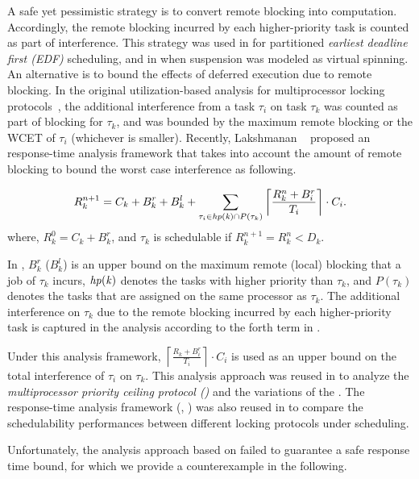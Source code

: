 A safe yet pessimistic strategy is to convert remote blocking into computation. Accordingly, the remote blocking incurred by each higher-priority task is counted as part of interference. This strategy was used in \cite{block-2007} for partitioned \emph{earliest deadline first (EDF)} scheduling, and in \cite{lakshmanan-2009} when suspension was modeled as virtual spinning. An alternative is to bound the effects of deferred execution due to remote blocking. In the original utilization-based analysis for multiprocessor locking protocols~\cite{rajkumar-1990,RSL:88}, the additional interference from a task $\tau_i$ on task $\tau_k$ was counted as part of blocking for $\tau_k$, and was bounded by the maximum remote blocking or the WCET of $\tau_i$ (whichever is smaller). Recently, Lakshmanan \etal~\cite{lakshmanan-2009} proposed an response-time analysis framework that takes into account the amount of remote blocking to bound the worst case interference as following. 

\begin{align}
\label{eq:wcrt}
R_k^{n+1} = C_k + B_k^r + B_k^l + \sum_{\tau_i \in \fun{hp(k)} \cap P(\tau_k)} \left \lceil \frac{R_k^n + B_i^r}{T_i} \right \rceil \cdot C_i.  
\end{align}
where, $R_k^0 = C_k + B_k^r$, and $\tau_k$ is schedulable if $R_k^{n+1} = R_k^n < D_k$. 

In , $B_k^r$ ($B_k^l$) is an upper bound on the maximum remote (local) blocking that a job of $\tau_k$ incurs, $\mathit{hp(k)}$ denotes the tasks with higher priority than $\tau_k$, and $P(\tau_k)$ denotes the tasks that are assigned on the same processor as $\tau_k$. The additional interference on $\tau_k$ due to the remote blocking incurred by each higher-priority task is captured in the analysis according to the forth term in .

Under this analysis framework, $\left \lceil \frac{R_k + B_i^r}{T_i} \right \rceil \cdot C_i$ is used as an upper bound on the total interference of $\tau_i$ on $\tau_k$. This analysis approach was reused in \cite{yang-2013,kim-2014,carminati-2014,yang-2014} to analyze the \emph{multiprocessor priority ceiling protocol (\mpcp)} and the variations of the \mpcp. The response-time analysis framework (\ie, ) was also reused in \cite{zeng-2011,bbb-2013,han-2014} to compare the schedulability performances between different locking protocols under \pfp scheduling. 

Unfortunately, the analysis approach based on  failed to guarantee a safe response time bound, for which we provide a counterexample in the following.

